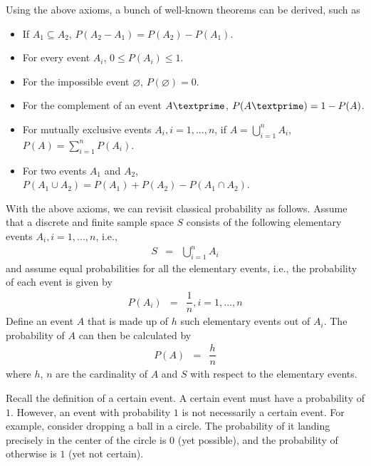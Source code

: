 Using the above axioms, a bunch of well-known theorems can be derived, such as
\begin{itemize}
  \item If $A_1 \subseteq A_2$, $P(A_2-A_1) = P(A_2)-P(A_1)$.
  \item For every event $A_i$, $0\leq P(A_i) \leq 1$.
  \item For the impossible event $\varnothing$, $P(\varnothing)=0$.
  \item For the complement of an event $A\textprime$, $P(A\textprime)=1-P(A)$.
  \item For mutually exclusive events $A_i, i=1,...,n$, if $A = \bigcup_{i=1}^{n} A_i$, $P(A) = \sum_{i=1}^{n}P(A_i)$.
  \item For two events $A_1$ and $A_2$, $P\left(A_1\cup A_2\right) = P(A_1)+P(A_2)-P\left(A_1\cap A_2\right)$.
\end{itemize}

With the above axioms, we can revisit classical probability as follows. Assume that a discrete and finite sample space $S$ consists of the following elementary events $A_i, i=1,...,n$, i.e.,
\begin{eqnarray}
  S &=& \bigcup_{i=1}^{n} A_i \nonumber
\end{eqnarray}
and assume equal probabilities for all the elementary events, i.e., the probability of each event is given by
\begin{eqnarray}
  P(A_i) &=& \dfrac{1}{n}, i=1,...,n \nonumber
\end{eqnarray}
Define an event $A$ that is made up of $h$ such elementary events out of $A_i$. The probability of $A$ can then be calculated by
\begin{eqnarray}
  P(A) &=& \dfrac{h}{n} \nonumber
\end{eqnarray}
where $h$, $n$ are the cardinality of $A$ and $S$ with respect to the elementary events.

Recall the definition of a certain event. A certain event must have a probability of $1$. However, an event with probability $1$ is not necessarily a certain event. For example, consider dropping a ball in a circle. The probability of it landing precisely in the center of the circle is $0$ (yet possible), and the probability of otherwise is $1$ (yet not certain).

